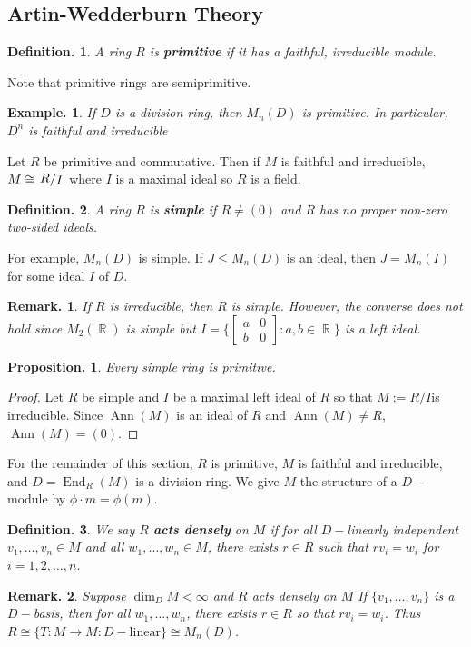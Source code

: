 \documentclass[11pt, a4paper]{memoir}
\DeclareMathOperator{\R}{{\mathbb{R}}}
\theoremstyle{change}
\newtheorem{proposition}[theorem]{Proposition.}
\theoremstyle{plain}
\theoremstyle{nonumberplain}
\newtheorem{definition}{Definition.}
\newtheorem{example}{Example.}
\newtheorem{remark}{Remark.}
\newtheorem{proof}{Proof}
\DeclareMathOperator{\Ann}{Ann}
\DeclareMathOperator{\End}{End}
\newcommand{\quot}[2]{\mathchoice{\left.\raisebox{0.14em}{$#1$}\middle/\raisebox{-0.14em}{$#2$}\right.}
                                 {\left.\raisebox{0.08em}{$#1$}\middle/\raisebox{-0.08em}{$#2$}\right.}
                                 {\left.\raisebox{0.03em}{$#1$}\middle/\raisebox{-0.03em}{$#2$}\right.}
                                 {\left.\raisebox{0em}{$#1$}\middle/\raisebox{0em}{$#2$}\right.}}
\numberwithin{equation}{section}
\begin{document}
\subsection{Artin-Wedderburn Theory}
\begin{definition}
    A ring $R$ is \textbf{primitive} if it has a faithful, irreducible module.
\end{definition}
Note that primitive rings are semiprimitive.
\begin{example}
    If $D$ is a division ring, then $M_n(D)$ is primitive.
    In particular, $D^n$ is faithful and irreducible
\end{example}
Let $R$ be primitive and commutative.
Then if $M$ is faithful and irreducible, $M\cong\quot{R}{I}$ where $I$ is a maximal ideal so $R$ is a field.
\begin{definition}
    A ring $R$ is \textbf{simple} if $R\neq(0)$ and $R$ has no proper non-zero two-sided ideals.
\end{definition}
For example, $M_n(D)$ is simple.
If $J\leq M_n(D)$ is an ideal, then $J=M_n(I)$ for some ideal $I$ of $D$.
\begin{remark}
    If $R$ is irreducible, then $R$ is simple.
    However, the converse does not hold since $M_2(\R)$ is simple but $I=\{\begin{bmatrix}a&0\\b&0\end{bmatrix}:a,b\in\R\}$ is a left ideal.
\end{remark}
\begin{proposition}
    Every simple ring is primitive.
\end{proposition}
\begin{proof}
    Let $R$ be simple and $I$ be a maximal left ideal of $R$ so that $M:=R/I$is irreducible.
    Since $\Ann(M)$ is an ideal of $R$ and $\Ann(M)\neq R$, $\Ann(M)=(0)$.
\end{proof}
For the remainder of this section, $R$ is primitive, $M$ is faithful and irreducible, and $D=\End_R(M)$ is a division ring.
We give $M$ the structure of a $D-$module by $\phi\cdot m=\phi(m)$.
\begin{definition}
    We say $R$ \textbf{acts densely} on $M$ if for all $D-$linearly independent $v_1,\ldots,v_n\in M$ and all $w_1,\ldots,w_n\in M$, there exists $r\in R$ such that $rv_i=w_i$ for $i=1,2,\ldots,n$.
\end{definition}
\begin{remark}
    Suppose $\dim_DM<\infty$ and $R$ acts densely on $M$
    If $\{v_1,\ldots,v_n\}$ is a $D-$basis, then for all $w_1,\ldots,w_n$, there exists $r\in R$ so that $rv_i=w_i$.
    Thus $R\cong\{T:M\to M:D-\text{linear}\}\cong M_n(D)$.
\end{remark}
\end{document}
